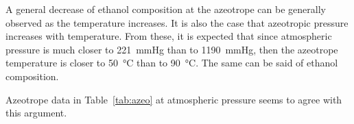 A general decrease of ethanol composition at the azeotrope can be generally
observed as the temperature increases. It is also the case that azeotropic
pressure increases with temperature. From these, it is expected that since
atmospheric pressure is much closer to \SI{221}{\mmHg} than to \SI{1190}
{\mmHg}, then the azeotrope temperature is closer to \SI{50}{\celsius} than
to \SI{90}{\celsius}. The same can be said of ethanol composition.

Azeotrope data \cite[p.~331]{crc} in Table~\ref{tab:azeo} at atmospheric pressure
seems to agree with this argument.
